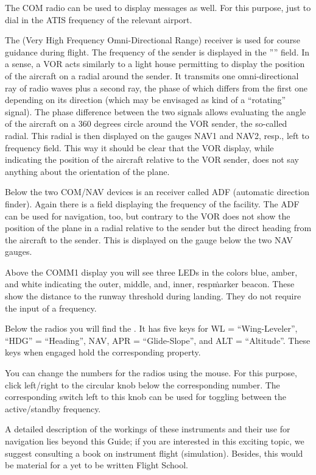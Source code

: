 The COM radio can be used to display  messages as well. For
this purpose, just to dial in the ATIS frequency of the relevant
airport.

The  (Very High Frequency Omni-Directional Range) receiver is used
for course
guidance during flight. The frequency of the sender is displayed in the
'''' field. In a sense, 
a VOR acts similarly to a light house permitting to display the position of the
aircraft on a radial around the sender. It transmits one omni-directional ray of
radio
waves plus a second ray, the phase of which differs from the first one depending
on its
direction (which may be envisaged as kind of a ``rotating'' signal). The phase
difference between the two 
signals allows evaluating the angle of the aircraft on a 360 degrees circle
around the VOR sender, the so-called radial. This radial is then displayed on
the gauges
NAV1 and NAV2, resp., left to frequency field. This way it should be clear that
the VOR display, while 
indicating the position of the aircraft relative to the VOR sender, does not say
anything about the orientation of the plane. 

Below the two COM/NAV devices is an  receiver called ADF (automatic
direction
finder). Again there is a field displaying the frequency of the facility. The
ADF can be
used for navigation, too, but contrary to the VOR does not show the position of
the plane
in a radial relative to the sender but the direct heading from the aircraft to
the
sender. This is displayed on the gauge below the two NAV gauges.

Above the COMM1 display you will see three LEDs in the colors blue, amber, and
white
indicating the outer, middle, and, inner, resp\. marker beacon. These show the distance to the
runway
threshold during landing. They do not require the input of a frequency. 

Below the radios you will find the . It has five keys
for WL = ``Wing-Leveler'', ``HDG'' = ``Heading'', NAV, APR =
``Glide-Slope'', and ALT = ``Altitude''. These keys when engaged hold
the corresponding property.

You can change the numbers for the radios using the mouse. For this
purpose, click left/right to the circular knob below the corresponding
number. The corresponding switch left to this knob can be used for
toggling between the active/standby frequency.

A detailed description of the workings of these instruments and their use for
navigation
lies beyond this Guide; if you are interested in this exciting topic, we suggest
consulting a book on instrument flight (simulation). Besides, this would be
material for
a yet to be written \FlightGear{} Flight School. 

